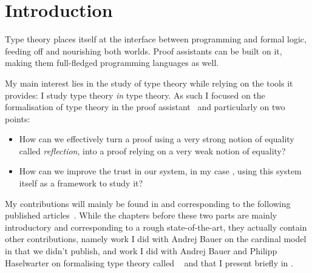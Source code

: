 \chapter{Introduction}


Type theory places itself at the interface between programming and formal logic,
feeding off and nourishing both worlds. Proof assistants can be built on it,
making them full-fledged programming languages as well.

My main interest lies in the study of type theory while relying on the tools it
provides: I study type theory \emph{in} type theory.
As such I focused on the formalisation of type theory in the \Coq proof
assistant~ and particularly on two points:
\begin{itemize}
  \item How can we effectively turn a proof using a very strong notion of
  equality called \emph{reflection}, into a proof relying on a very weak notion
  of equality?
  \item How can we improve the trust in our system, in my case \Coq, using this
  system itself as a framework to study it?
\end{itemize}

My contributions will mainly be found in  and
 corresponding to the following published
articles~.
While the chapters before these two parts are mainly introductory and
corresponding to a rough state-of-the-art, they actually contain other
contributions, namely work I did with Andrej Bauer on the cardinal model
in  that we didn't publish, and work I did with Andrej Bauer
and Philipp Haselwarter on formalising type theory called
\ftt~ and that I present briefly in
.